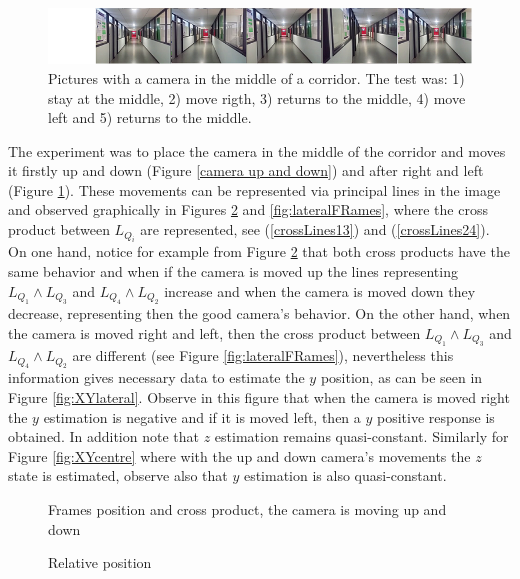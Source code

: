 \begin{figure} [h!]
\centering
\includegraphics[scale=0.5]{Chapter03/Images/Lateral_m.png}
\caption{Pictures with a camera in the middle of a corridor. The test was: 1) stay at the middle, 2) move rigth, 3) returns to the middle, 4) move left and 5) returns to the middle. }
\label{camera right and left}
\end{figure}

The experiment was to place the camera in the middle of the corridor and moves it firstly up and down (Figure \ref{camera up and down}) and after right and left (Figure \ref{camera right and left}). These movements can be represented via principal lines in the image and observed graphically in Figures  \ref{fig:CentreFrames} and \ref{fig:lateralFRames}, where the cross product between $L_{Q_i}$ are represented, see (\ref{crossLines13}) and (\ref{crossLines24}). On one hand, notice for example from Figure \ref{fig:CentreFrames}  that both cross products have the same behavior and when if the camera is moved up the lines representing $L_{Q_1}\wedge L_{Q_3}$  and $L_{Q_4}\wedge L_{Q_2}$ increase and when the camera is moved down they decrease, representing then the good camera's behavior. On the other hand, when the camera is moved right and left, then the cross product between $L_{Q_1}\wedge L_{Q_3}$  and $L_{Q_4}\wedge L_{Q_2}$ are different (see Figure  \ref{fig:lateralFRames}), nevertheless this information gives necessary data to estimate the $y$ position, as can be seen in Figure  \ref{fig:XYlateral}. Observe in this figure that when the camera is moved right the $y$ estimation is negative and if it is moved left, then a $y$ positive response is obtained. In addition note that $z$ estimation remains quasi-constant. Similarly for Figure \ref{fig:XYcentre} where with the up and down camera's movements the $z$ state is estimated, observe also that $y$ estimation is also quasi-constant.



\begin{figure}[h!]
        \centering
        
   \caption{Frames position and cross product, the camera is moving up and down}
    \label{fig:CentreFrames}
 \end{figure}
   
      
\begin{figure}[h!]
        \centering
      
      \label{fig:XYcentre}
      \caption{Relative position} 
    \label{fig:centrePosition}
  \end{figure}



